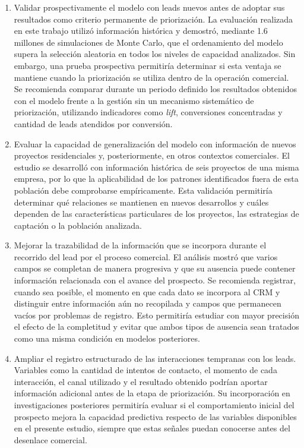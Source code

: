 \begin{enumerate}

    \item Validar prospectivamente el modelo con leads nuevos antes de adoptar sus resultados como criterio permanente de priorización. La evaluación realizada en este trabajo utilizó información histórica y demostró, mediante 1.6 millones de simulaciones de Monte Carlo, que el ordenamiento del modelo supera la selección aleatoria en todos los niveles de capacidad analizados. Sin embargo, una prueba prospectiva permitiría determinar si esta ventaja se mantiene cuando la priorización se utiliza dentro de la operación comercial. Se recomienda comparar durante un periodo definido los resultados obtenidos con el modelo frente a la gestión sin un mecanismo sistemático de priorización, utilizando indicadores como \textit{lift}, conversiones concentradas y cantidad de leads atendidos por conversión.

    \item Evaluar la capacidad de generalización del modelo con información de nuevos proyectos residenciales y, posteriormente, en otros contextos comerciales. El estudio se desarrolló con información histórica de seis proyectos de una misma empresa, por lo que la aplicabilidad de los patrones identificados fuera de esta población debe comprobarse empíricamente. Esta validación permitiría determinar qué relaciones se mantienen en nuevos desarrollos y cuáles dependen de las características particulares de los proyectos, las estrategias de captación o la población analizada.

    \item Mejorar la trazabilidad de la información que se incorpora durante el recorrido del lead por el proceso comercial. El análisis mostró que varios campos se completan de manera progresiva y que su ausencia puede contener información relacionada con el avance del prospecto. Se recomienda registrar, cuando sea posible, el momento en que cada dato se incorpora al CRM y distinguir entre información aún no recopilada y campos que permanecen vacíos por problemas de registro. Esto permitiría estudiar con mayor precisión el efecto de la completitud y evitar que ambos tipos de ausencia sean tratados como una misma condición en modelos posteriores.

    \item Ampliar el registro estructurado de las interacciones tempranas con los leads. Variables como la cantidad de intentos de contacto, el momento de cada interacción, el canal utilizado y el resultado obtenido podrían aportar información adicional antes de la etapa de priorización. Su incorporación en investigaciones posteriores permitiría evaluar si el comportamiento inicial del prospecto mejora la capacidad predictiva respecto de las variables disponibles en el presente estudio, siempre que estas señales puedan conocerse antes del desenlace comercial.


\end{enumerate}
